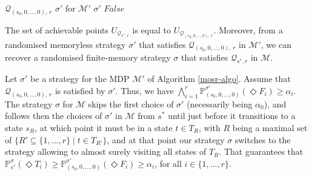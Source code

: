 \begin{algorithm}[h!]
\begin{algorithmic}[1]
 $\mathcal{Q}_{(s_0, 0, \dots, 0),\, r}$ 
   $\sigma'$ for $\mathcal{M}'$
  \RETURN $\sigma'$
\ELSE
  \RETURN $False$
\ENDIF
\end{algorithmic}
\end{algorithm}

\begin{lemma}
  The set of achievable points $U_{\mathcal{Q}_{s^*, r}}$ is equal to $ U_{\mathcal{Q}_{(s_0,0, \dots, 0),\, r}}$. Moreover, from a randomised memoryless strategy $\sigma'$ that satisfies $\mathcal{Q}_{(s_0, 0, \dots, 0), \, r}$ in $\mathcal{M}'$, we can recover a randomised finite-memory strategy $\sigma$ that satisfies $\mathcal{Q}_{s^*, r}$ in $\mathcal{M}$.
\end{lemma}

\begin{proof2}
  Let $\sigma'$ be a strategy for the MDP $\mathcal{M}'$ of Algorithm \ref{mosr-algo}.
  Assume that $\mathcal{Q}_{(s_0, 0, \dots, 0),\, r}$ is satisfied by $\sigma'$. Thus, we have $\bigwedge_{i=1}^r\mathbb{P}_{(s_0, 0, \dots, 0)}^{\sigma'}(\Diamond F_i) \geq \alpha_i$.
  The strategy $\sigma$ for $\mathcal{M}$ skips the first choice of $\sigma'$ (necessarily being $\alpha_0$), and follows then the choices of $\sigma'$ in $\mathcal{M}$ from $s^*$ until just before it transitions to a state $s_R$, at which point it must be in a state $t \in T_R$, with $R$ being a maximal set of $\{ R' \subseteq \{1, \dots, r\} \; | \; t \in T_{R'} \}$, and at
  that point our strategy $\sigma$ switches to the strategy allowing to almost surely visiting all states of $T_R$. That guarantees that $\mathbb{P}_{s^*}^\sigma(\Diamond T_i) \geq \mathbb{P}_{(s_0, 0, \dots, 0)}^{\sigma'}(\Diamond F_i) \geq \alpha_i$, for all $i \in \{1, \dots, r\}$.

\end{proof2}


